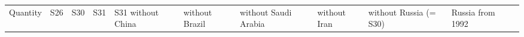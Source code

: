 \documentclass[11pt,a4paper]{article}
\newcounter{none}                    %
\begin{document}
{\def\LTcaptype{none} %
\begin{longtable}[]{@{}
  >{\raggedright\arraybackslash}p{}
  >{\raggedright\arraybackslash}p{}
  >{\raggedright\arraybackslash}p{}
  >{\raggedright\arraybackslash}p{}
  >{\raggedright\arraybackslash}p{}
  >{\raggedright\arraybackslash}p{}
  >{\raggedright\arraybackslash}p{}
  >{\raggedright\arraybackslash}p{}
  >{\raggedright\arraybackslash}p{}
  >{\raggedright\arraybackslash}p{}
  >{\raggedright\arraybackslash}p{}@{}}
\toprule\noalign{}
\begin{minipage}[b]{\linewidth}\raggedright
Quantity
\end{minipage} & \begin{minipage}[b]{\linewidth}\raggedright
S26
\end{minipage} & \begin{minipage}[b]{\linewidth}\raggedright
S30
\end{minipage} & \begin{minipage}[b]{\linewidth}\raggedright
S31
\end{minipage} & \begin{minipage}[b]{\linewidth}\raggedright
S31 without China
\end{minipage} & \begin{minipage}[b]{\linewidth}\raggedright
without Brazil
\end{minipage} & \begin{minipage}[b]{\linewidth}\raggedright
without Saudi Arabia
\end{minipage} & \begin{minipage}[b]{\linewidth}\raggedright
without Iran
\end{minipage} & \begin{minipage}[b]{\linewidth}\raggedright
without Russia (= S30)
\end{minipage} & \begin{minipage}[b]{\linewidth}\raggedright
Russia from 1992
\end{minipage} & \begin{minipage}[b]{\linewidth}\raggedright

\end{minipage}
\end{longtable}}
\end{document}
